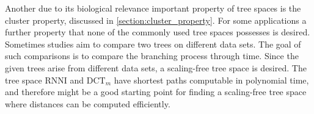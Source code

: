 \documentclass[11pt]{amsart}
\newcommand{\rnni}{\mathrm{RNNI}}
\newcommand{\dtt}{\mathrm{DCT}}
\newcommand{\summary}[1]{} %
\begin{document}
\summary{scaling-free tree space}
Another due to its biological relevance important property of tree spaces is the cluster property, discussed in \autoref{section:cluster_property}.
For some applications a further property that none of the commonly used tree spaces possesses is desired.
Sometimes studies aim to compare two trees on different data sets.
The goal of such comparisons is to compare the branching process through time.
Since the given trees arise from different data sets, a scaling-free tree space is desired.
The tree space $\rnni$ and $\dtt_m$ have shortest paths computable in polynomial time, and therefore might be a good starting point for finding a scaling-free tree space where distances can be computed efficiently.

\printbibliography
\end{document}
